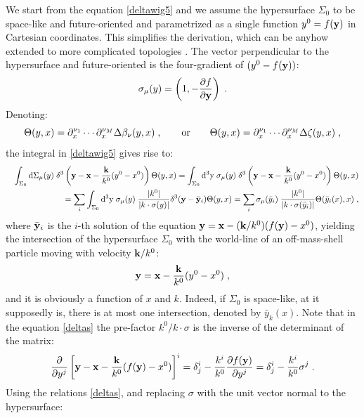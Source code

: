 \documentclass[prd,superscriptaddress,nofootinbib,notitlepage]{revtex4-1}
\newcommand{\di}{{\rm d}}
\begin{document}
We start from the equation \eqref{deltawig5} and we assume the hypersurface $\Sigma_0$ to be space-like and future-oriented 
and parametrized as a single function $y^0 = f({\bf y})$ in Cartesian coordinates. This simplifies the derivation, which can be 
anyhow extended to more complicated topologies \cite{Sheng:2025cjk}. The vector perpendicular to the hypersurface and future-oriented 
is the four-gradient of $(y^0 - f({\bf y}))$:
%
\begin{equation*}
\sigma_{\mu}(y)=\left(1,-\frac{\partial f}{\partial{\bf y}}\right)\;.
\end{equation*}
%
Denoting:
%
$$
 \Theta(y,x) = \partial^{\nu_{1}}_{x}\cdots\partial^{\nu_{M}}_{x} \Delta\beta_{\nu}(y,x)\;,
 \qquad {\rm or} \qquad \Theta(y,x) = \partial^{\nu_{1}}_{x}\cdots\partial^{\nu_{M}}_{x} \Delta\zeta(y,x)\;,
$$
%
the integral in \eqref{deltawig5} gives rise to:
%
\begin{eqnarray}\label{deltas}
&& \int_{\Sigma_0} \di \Sigma_{\mu}(y) \; \delta^{3}\left({\bf y}-{\bf x}-\frac{\bf k}{k^{0}}
(y^{0}-x^{0})\right) \Theta(y,x) = \int_{\Sigma_0} \di^3 {\rm y} \; \sigma_{\mu}(y)\;  
\delta^{3}\left({\bf y}-{\bf x}-\frac{\bf k}{k^{0}}(y^{0}-x^{0})\right) \Theta(y,x) \nonumber \\
&& = \sum_{i} \int_{\Sigma_0} \di^3 {\rm y} \; \sigma_{\mu}(y)\; \frac{|k^0|}{|k\cdot\sigma(y)|}
\delta^{3}({\bf y}-\bar{\bf y}_{i}) \Theta(y,x) = \sum_{i} \sigma_{\mu}(\bar y_{i})\; \frac{|k^0|}{|k\cdot\sigma(\bar y_{i})|} \Theta(\bar y_{i}(x),x)\;,
\end{eqnarray} 
%
where $\bar{\bf y}_{i}$ is the $i$-th solution of the equation ${\bf y} = {\bf x}-({\bf k}/k^0)(f({\bf y})-
x^{0})$, yielding the intersection of the hypersurface $\Sigma_0$ with the world-line of an off-mass-shell particle moving 
with velocity ${\bf k}/k^0$:
%
\begin{equation*}
    {\bf y} = {\bf x}-\frac{\bf k}{k^{0}}(y^0-x^0)\;,
\end{equation*}
%
and it is obviously a function of $x$ and $k$. Indeed, if $\Sigma_0$ is space-like, at it supposedly is, there is at 
most one intersection, denoted by $\bar y_k(x)$. Note that in the equation \eqref{deltas} the pre-factor $k^0/ k\cdot \sigma$ 
is the inverse of the determinant of the matrix:
%
$$
\frac{\partial}{\partial y^j}\left[{\bf y}-{\bf x}- \frac{\bf k}{k^0}(f({\bf y})-x^{0})\right]^i =
\delta^i_j - \frac{k^i}{k^0} \frac{\partial f({\bf y})}{\partial y^j} = \delta^i_j - \frac{k^i}{k^0} 
\sigma^j \;. 
$$
%
Using the relations \eqref{deltas}, and replacing $\sigma$ with the unit vector normal to the hypersurface:
\end{document}
